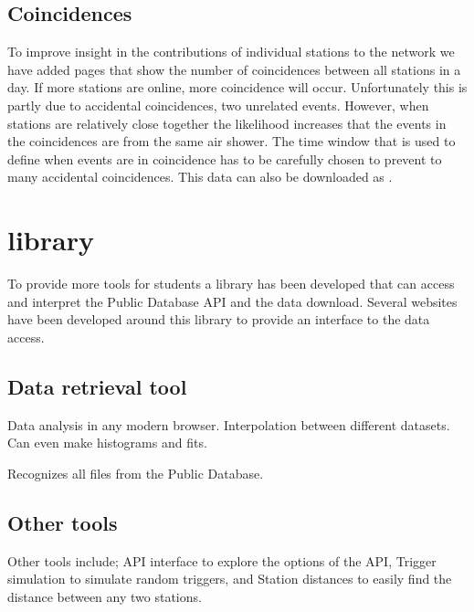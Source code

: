 \subsection{Coincidences}

To improve insight in the contributions of individual stations to the
\hisparc network we have added pages that show the number of
coincidences between all \hisparc stations in a day. If more stations
are online, more coincidence will occur. Unfortunately this is partly
due to accidental coincidences, two unrelated events. However, when
stations are relatively close together the likelihood increases that the
events in the coincidences are from the same air shower. The time window
that is used to define when events are in coincidence has to be
carefully chosen to prevent to many accidental coincidences. This data
can also be downloaded as \tsv.


\section{\jsparc \javascript library}

To provide more tools for students a \javascript library has been
developed that can access and interpret the Public Database API and the
data download. Several websites have been developed around this library
to provide an interface to the data access.


\subsection{Data retrieval tool}

Data analysis in any modern browser.
Interpolation between different datasets. Can even make histograms and fits.

Recognizes all \tsv files from the Public Database.


\subsection{Other tools}

Other tools include; API interface to explore the options of the API,
Trigger simulation to simulate random triggers, and Station distances to
easily find the distance between any two stations.
